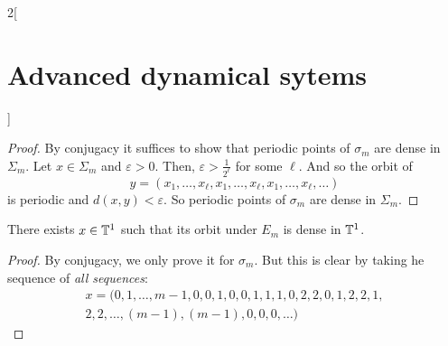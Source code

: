 \documentclass[../../../main_math.tex]{subfiles}
\begin{document}
\begin{multicols}{2}[\section{Advanced dynamical sytems}]
\begin{proof}
    By conjugacy it suffices to show that periodic points of $\sigma_m$ are dense in $\Sigma_m$. Let $x\in \Sigma_m$ and $\varepsilon>0$. Then, $\varepsilon>\frac{1}{2^\ell}$ for some $\ell$. And so the orbit of
    $$
      y=(x_1,\ldots,x_\ell,x_1,\ldots,x_\ell,x_1,\ldots,x_\ell,\ldots)
    $$
    is periodic and $d(x,y)<\varepsilon$. So periodic points of $\sigma_m$ are dense in $\Sigma_m$.
  \end{proof}
  \begin{proposition}
    There exists $x\in \mathbb{T}^1$ such that its orbit under $E_m$ is dense in $\mathbb{T}^1$.
  \end{proposition}
  \begin{proof}
    By conjugacy, we only prove it for $\sigma_m$. But this is clear by taking he sequence of \textit{all sequences}:
    \begin{multline*}
      x=(0,1,\ldots,m-1,0,0,1,0,0,1,1,1,0,2,2,0,1,2,2,1,\\2,2,\ldots,(m-1), (m-1),0,0,0,\ldots)
    \end{multline*}
  \end{proof}

\end{multicols}
\end{document}
